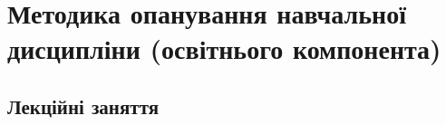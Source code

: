\documentclass{Syllabus}
\begin{document}

\section{Методика опанування навчальної дисципліни (освітнього компонента)}

\vspace*{3ex}
\subsection*{Лекційні заняття}
\vspace*{3ex}
\end{document}
